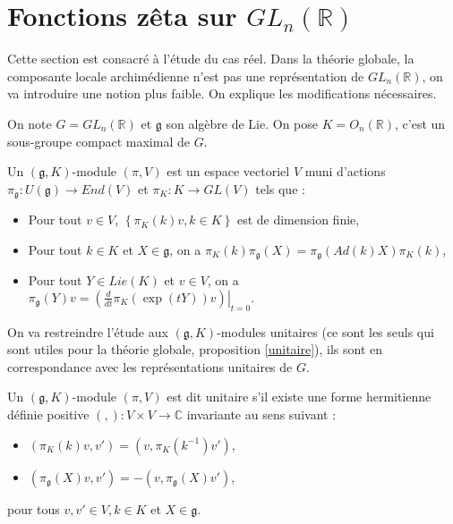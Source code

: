 \section{Fonctions zêta sur $GL_n(\mathbb{R})$}

Cette section est consacré à l'étude du cas réel. Dans la théorie globale, la composante locale archimédienne n'est pas une représentation de $GL_n(\mathbb{R})$, on va introduire une notion plus faible. On explique les modifications nécessaires.

On note $G=GL_n(\mathbb{R})$ et $\mathfrak{g}$ son algèbre de Lie. On pose $K=O_n(\mathbb{R})$, c'est un sous-groupe compact maximal de $G$.

\begin{definition}
Un $(\mathfrak{g}, K)$-module $(\pi, V)$ est un espace vectoriel $V$ muni d'actions $\pi_\mathfrak{g} : U(\mathfrak{g}) \rightarrow End(V)$ et $\pi_K : K \rightarrow GL(V)$ tels que :
\begin{itemize}
\item Pour tout $v \in V$, $\left\lbrace \pi_K(k)v, k \in K \right\rbrace$ est de dimension finie,
\item Pour tout $k \in K$ et $X \in \mathfrak{g}$, on a
$\pi_K(k)\pi_\mathfrak{g}(X) = \pi_\mathfrak{g}(Ad(k)X)\pi_K(k)$,
\item Pour tout $Y \in Lie(K)$ et $v \in V$, on a
$\pi_\mathfrak{g}(Y)v = \left.\left(\frac{d}{dt}\pi_K(\exp(tY))v\right)\right|_{t=0}.$
\end{itemize}
\end{definition}

On va restreindre l'étude aux $(\mathfrak{g}, K)$-modules unitaires (ce sont les seuls qui sont utiles pour la théorie globale, proposition \ref{unitaire}), ils sont en correspondance avec les représentations unitaires de $G$.

\begin{definition}
Un $(\mathfrak{g}, K)$-module $(\pi, V)$ est dit unitaire s'il existe une forme hermitienne définie positive $(,) : V \times V \rightarrow \mathbb{C}$ invariante au sens suivant :
\begin{itemize}
\item $(\pi_K(k)v, v') = (v, \pi_K(k^{-1})v')$,
\item $(\pi_\mathfrak{g}(X)v, v') = -(v, \pi_\mathfrak{g}(X)v')$,
\end{itemize}
pour tous $v, v' \in V, k \in K$ et $X \in \mathfrak{g}$.
\end{definition}

